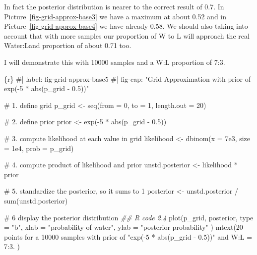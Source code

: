 \documentclass[
  letterpaper,
  DIV=11,
  numbers=noendperiod]{scrreprt}
\newenvironment{Shaded}{\begin{snugshade}}{\end{snugshade}}
\newcommand{\AttributeTok}[1]{\textcolor[rgb]{0.40,0.45,0.13}{#1}}
\newcommand{\CommentTok}[1]{\textcolor[rgb]{0.37,0.37,0.37}{#1}}
\newcommand{\DecValTok}[1]{\textcolor[rgb]{0.68,0.00,0.00}{#1}}
\newcommand{\DocumentationTok}[1]{\textcolor[rgb]{0.37,0.37,0.37}{\textit{#1}}}
\newcommand{\FloatTok}[1]{\textcolor[rgb]{0.68,0.00,0.00}{#1}}
\newcommand{\FunctionTok}[1]{\textcolor[rgb]{0.28,0.35,0.67}{#1}}
\newcommand{\InformationTok}[1]{\textcolor[rgb]{0.37,0.37,0.37}{#1}}
\newcommand{\NormalTok}[1]{\textcolor[rgb]{0.00,0.23,0.31}{#1}}
\newcommand{\OtherTok}[1]{\textcolor[rgb]{0.00,0.23,0.31}{#1}}
\newcommand{\SpecialCharTok}[1]{\textcolor[rgb]{0.37,0.37,0.37}{#1}}
\newcommand{\StringTok}[1]{\textcolor[rgb]{0.13,0.47,0.30}{#1}}
\begin{document}
In fact the posterior distribution is nearer to the correct result of
0.7. In Picture~\ref{fig-grid-approx-base3} we have a maximum at about
0.52 and in Picture~\ref{fig-grid-approx-base4} we have already 0.58. We
should also taking into account that with more samples our proportion of
W to L will approach the real Water:Land proportion of about 0.71 too.

I will demonstrate this with 10000 samples and a W:L proportion of 7:3.

\begin{Shaded}
\begin{Highlighting}[]
\InformationTok{\textasciigrave{}\textasciigrave{}\textasciigrave{}\{r\}}
\CommentTok{\#| label: fig{-}grid{-}approx{-}base5}
\CommentTok{\#| fig{-}cap: "Grid Approximation with prior of \textasciigrave{}exp({-}5 * abs(p\_grid {-} 0.5))\textasciigrave{}"}

\CommentTok{\# 1. define grid}
\NormalTok{p\_grid }\OtherTok{\textless{}{-}} \FunctionTok{seq}\NormalTok{(}\AttributeTok{from =} \DecValTok{0}\NormalTok{, }\AttributeTok{to =} \DecValTok{1}\NormalTok{, }\AttributeTok{length.out =} \DecValTok{20}\NormalTok{)}

\CommentTok{\# 2. define prior}
\NormalTok{prior }\OtherTok{\textless{}{-}} \FunctionTok{exp}\NormalTok{(}\SpecialCharTok{{-}}\DecValTok{5} \SpecialCharTok{*} \FunctionTok{abs}\NormalTok{(p\_grid }\SpecialCharTok{{-}} \FloatTok{0.5}\NormalTok{))}

\CommentTok{\# 3. compute likelihood at each value in grid}
\NormalTok{likelihood }\OtherTok{\textless{}{-}} \FunctionTok{dbinom}\NormalTok{(}\AttributeTok{x =} \FloatTok{7e3}\NormalTok{, }\AttributeTok{size =} \FloatTok{1e4}\NormalTok{, }\AttributeTok{prob =}\NormalTok{ p\_grid)}

\CommentTok{\# 4. compute product of likelihood and prior}
\NormalTok{unstd.posterior }\OtherTok{\textless{}{-}}\NormalTok{ likelihood }\SpecialCharTok{*}\NormalTok{ prior}

\CommentTok{\# 5. standardize the posterior, so it sums to 1}
\NormalTok{posterior }\OtherTok{\textless{}{-}}\NormalTok{ unstd.posterior }\SpecialCharTok{/} \FunctionTok{sum}\NormalTok{(unstd.posterior)}

\CommentTok{\# 6 display the posterior distribution }
\DocumentationTok{\#\# R code 2.4}
\FunctionTok{plot}\NormalTok{(p\_grid, posterior,}
  \AttributeTok{type =} \StringTok{"b"}\NormalTok{,}
  \AttributeTok{xlab =} \StringTok{"probability of water"}\NormalTok{, }\AttributeTok{ylab =} \StringTok{"posterior probability"}
\NormalTok{)}
\FunctionTok{mtext}\NormalTok{(}\StringTok{\textquotesingle{}20 points for a 10000 samples with prior of "exp({-}5 * abs(p\_grid {-} 0.5))" and W:L = 7:3.\textquotesingle{}}\NormalTok{ )}
\InformationTok{\textasciigrave{}\textasciigrave{}\textasciigrave{}}
\end{Highlighting}
\end{Shaded}
\end{document}
